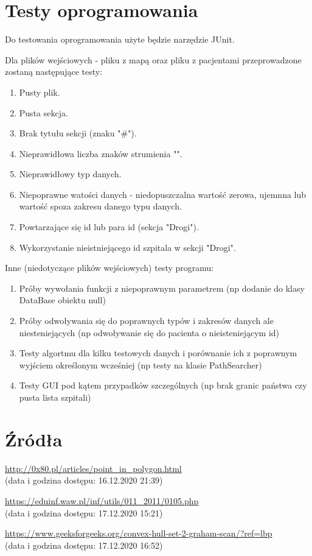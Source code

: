 \documentclass[10pt,a4paper]{article}
\begin{document}
\section{Testy oprogramowania}

Do testowania oprogramowania użyte będzie narzędzie JUnit.

Dla plików wejściowych - pliku z mapą oraz pliku z pacjentami przeprowadzone zostaną następujące testy:
 
\begin{enumerate}
    \item Pusty plik.
    \item Pusta sekcja.
    \item Brak tytułu sekcji (znaku "\#").
    \item Nieprawidłowa liczba znaków strumienia "\textbar".
    \item Nieprawidłowy typ danych.
    \item Niepoprawne watości danych - niedopuszczalna wartość zerowa, ujemnna lub wartość spoza zakresu danego typu danych.
    \item Powtarzające się id lub para id (sekcja "Drogi").
    \item Wykorzystanie nieistniejącego id szpitala w sekcji "Drogi".
\end{enumerate}

Inne (niedotyczące plików wejściowych) testy programu:
\begin{enumerate}
    \item Próby wywołania funkcji z niepoprawnym parametrem (np dodanie do klasy DataBase obiektu null)
    \item Próby odwoływania się do poprawnych typów i zakresów danych ale niesteniejących (np odwoływanie się do pacienta o nieisteniejącym id)
    \item Testy algortmu dla kilku testowych danych i porównanie ich z poprawnym wyjściem określonym wcześniej (np testy na klasie PathSearcher)
    \item Testy GUI pod kątem przypadków szczególnych (np brak granic państwa czy pusta lista szpitali)
\end{enumerate}


\section{Źródła}

\begin{enumerate}[{[1]}]
    \item \url{http://0x80.pl/articles/point_in_polygon.html} \\(data i godzina dostępu: 16.12.2020 21:39)
    \item \url{https://eduinf.waw.pl/inf/utils/011_2011/0105.php} \\(data i godzina dostępu: 17.12.2020 15:21)
    \item \url{https://www.geeksforgeeks.org/convex-hull-set-2-graham-scan/?ref=lbp} \\(data i godzina dostępu: 17.12.2020 16:52)
\end{enumerate}
\end{document}
